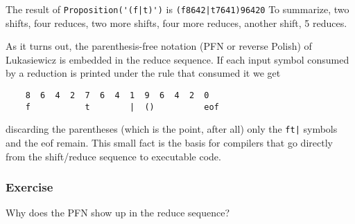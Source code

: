 \noindent The result of \verb+Proposition('(f|t)')+
is \verb+(f8642|t7641)96420+
\vspace{1em}
\noindent To summarize, two shifts, four reduces, two more shifts, 
four more reduces, another shift, 5 reduces.

As it turns out, the  
parenthesis-free notation (PFN or reverse Polish) of Lukasiewicz 
is embedded in the reduce sequence.  If each input symbol consumed by 
a reduction is printed under the rule that consumed it we get

\begin{verbatim}
    8  6  4  2  7  6  4  1  9  6  4  2  0
    f           t        |  ()          eof
\end{verbatim}
\noindent discarding the parentheses (which is the point, after all)
only the \verb+ft|+ symbols and the eof remain.  This small fact is the
basis for compilers that go directly from the shift/reduce sequence to 
executable code.

\subsubsection{Exercise} Why does the PFN show up in the reduce sequence?



